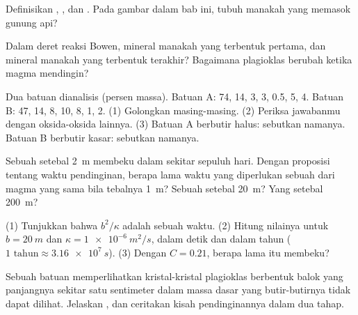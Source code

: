 \begin{exercise}[$\star$]\label{exo:g11:igneous-rocks:4}
Definisikan , , dan . Pada gambar  dalam bab ini, tubuh
manakah yang memasok gunung api?
\end{exercise}

\begin{exercise}[$\star$]\label{exo:g11:igneous-rocks:5}
Dalam deret reaksi Bowen, mineral manakah yang terbentuk pertama, dan mineral
manakah yang terbentuk terakhir? Bagaimana plagioklas berubah ketika magma
mendingin?
\end{exercise}

\begin{exercise}[$\star\star$]\label{exo:g11:igneous-rocks:6}
Dua batuan dianalisis (persen massa). Batuan A:  74, 
14,  3,  3,  0.5,  5,  4. Batuan B:
 47,  14,  8,  10,  8, 
1,  2. (1) Golongkan masing-masing. (2) Periksa jawabanmu dengan
oksida-oksida lainnya. (3) Batuan A berbutir halus: sebutkan namanya. Batuan B
berbutir kasar: sebutkan namanya.
\end{exercise}

\begin{exercise}[$\star\star$]\label{exo:g11:igneous-rocks:7}
Sebuah  setebal \qty{2}{m} membeku dalam sekitar sepuluh hari. Dengan
proposisi tentang waktu pendinginan, berapa lama waktu yang diperlukan sebuah
 dari magma yang sama bila tebalnya \qty{1}{m}? Sebuah  setebal
\qty{20}{m}? Yang setebal \qty{200}{m}?
\end{exercise}

\begin{exercise}[$\star\star$]\label{exo:g11:igneous-rocks:8}
(1) Tunjukkan bahwa $b^2/\kappa$ adalah sebuah waktu. (2) Hitung nilainya untuk
$b = \qty{20}{m}$ dan $\kappa = \qty{1e-6}{m^2/s}$, dalam detik dan dalam tahun
($\num{1}\text{ tahun} \approx \qty{3.16e7}{s}$). (3) Dengan $C = 0.21$, berapa
lama  itu membeku?
\end{exercise}

\begin{exercise}[$\star\star$]\label{exo:g11:igneous-rocks:9}
Sebuah batuan memperlihatkan kristal-kristal plagioklas berbentuk balok yang
panjangnya sekitar satu sentimeter dalam massa dasar yang butir-butirnya tidak
dapat dilihat. Jelaskan , dan ceritakan kisah pendinginannya dalam
dua tahap.
\end{exercise}

